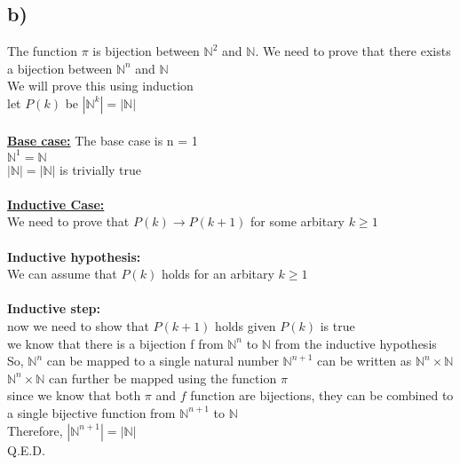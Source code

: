 \documentclass[11pt]{article}
\begin{document}
\subsection*{b)}
The function $\pi$ is bijection between $\mathbb{N}^2$ and $\mathbb{N}$.
We need to prove that there exists a bijection between $\mathbb{N}^n$ and $\mathbb{N}$ \\
We will prove this using induction \\
let $P(k)$ be $|\mathbb{N}^k| = |\mathbb{N}|$ \\
\\
\textbf{\underline{Base case:}} The base case is n = 1 \\
$\mathbb{N}^1 = \mathbb{N}$ \\
$|\mathbb{N}| = |\mathbb{N}|$ is trivially true \\
\\
\textbf{\underline{Inductive Case:}} \\
We need to prove that $P(k) \rightarrow P(k+1)$ for some arbitary $k \geq 1$ \\
\\
\textbf{Inductive hypothesis:} \\
We can assume that $P(k)$ holds for an arbitary $k \geq 1$ \\
\\
\textbf{Inductive step:} \\
now we need to show that $P(k+1)$ holds given $P(k)$ is true \\
we know that there is a bijection f from $\mathbb{N}^n$ to $\mathbb{N}$ from
the inductive hypothesis \\
So, $\mathbb{N}^n$ can be mapped to a single natural number
$\mathbb{N}^{n+1}$ can be written as $\mathbb{N}^n \times \mathbb{N}$ \\
$\mathbb{N}^n \times \mathbb{N}$ can further be mapped using the function $\pi$ \\
since we know that both $\pi$ and $f$ function are bijections, they can be
combined to a single bijective function from $\mathbb{N}^{n+1}$ to $\mathbb{N}$ \\
Therefore, $|\mathbb{N}^{n+1}| = |\mathbb{N}|$ \\
Q.E.D.
\end{document}
